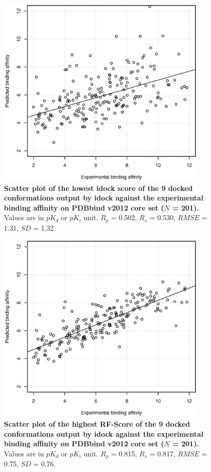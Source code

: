 \documentclass[10pt]{article}
\begin{document}
\begin{figure}[!ht]
\begin{center}
\includegraphics[width=4in]{pK-idockConf1idock.eps}
\end{center}
\caption{
{\bf Scatter plot of the lowest idock score of the 9 docked conformations output by idock against the experimental binding affinity on PDBbind v2012 core set ($N$ = 201).} Values are in $pK_d$ or $pK_i$ unit. $R_p$ = 0.502, $R_s$ = 0.530, $RMSE$ = 1.31, $SD$ = 1.32.
}
\label{pK-idockConf1idock}
\end{figure}

\begin{figure}[!ht]
\begin{center}
\includegraphics[width=4in]{pK-idockConfsRFScoreMax.eps}
\end{center}
\caption{
{\bf Scatter plot of the highest RF-Score of the 9 docked conformations output by idock against the experimental binding affinity on PDBbind v2012 core set ($N$ = 201).} Values are in $pK_d$ or $pK_i$ unit. $R_p$ = 0.815, $R_s$ = 0.817, $RMSE$ = 0.75, $SD$ = 0.76.
}
\label{pK-idockConfsRFScoreMax}
\end{figure}
\end{document}
